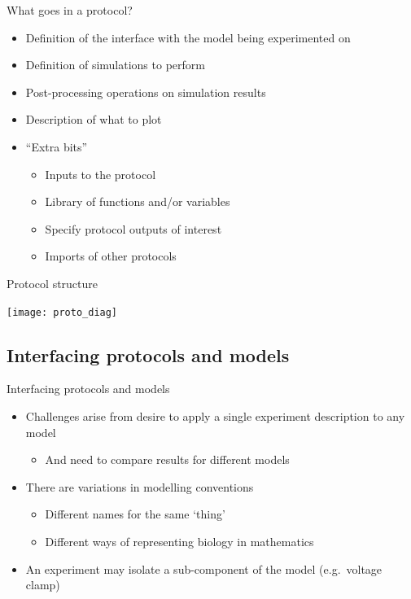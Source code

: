 \documentclass[t,xcolor={usenames,dvipsnames}]{beamer}
\newcommand{\subitem}[1]{\begin{itemize}[<.->]\item #1 \end{itemize}}
\begin{document}
\begin{frame}{What goes in a protocol?}
\begin{itemize}
\item Definition of the interface with the model being experimented on
\item Definition of simulations to perform
\item Post-processing operations on simulation results
\item Description of what to plot
\item ``Extra bits''
  \begin{itemize}
  \item Inputs to the protocol
  \item Library of functions and/or variables
  \item Specify protocol outputs of interest
  \item Imports of other protocols
  \end{itemize}
\end{itemize}
\end{frame}

\begin{frame}{Protocol structure}
\begin{center}
\vspace{-.5cm}
\texttt{[image: proto\_diag]}
\end{center}
\end{frame}

\subsection{Interfacing protocols and models}

\begin{frame}{Interfacing protocols and models}
\begin{itemize}
\item Challenges arise from desire to apply a single experiment description to any model
  \subitem{And need to compare results for different models}
\item There are variations in modelling conventions
  \begin{itemize}
  \item Different names for the same `thing'
  \item Different ways of representing biology in mathematics
  \end{itemize}
\item An experiment may isolate a sub-component of the model (e.g.\ voltage clamp)
\end{itemize}
\end{frame}
\end{document}
